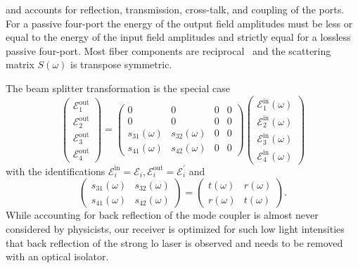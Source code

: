 and accounts for reflection, transmission, cross-talk, and coupling of the ports.
For a passive four-port the energy of the output field amplitudes must be less or equal to the energy of the input field amplitudes and strictly equal for a lossless passive four-port.
Most fiber components are reciprocal~\cite{NBS1981} and the scattering matrix $S(\omega)$ is transpose symmetric.

The beam splitter transformation is the special case
\begin{equation}
    \begin{pmatrix}
        \mathcal{E}_{1}^\text{out} \\
        \mathcal{E}_{2}^\text{out} \\
        \mathcal{E}_{3}^\text{out} \\
        \mathcal{E}_{4}^\text{out}
    \end{pmatrix}
    =
    \begin{pmatrix}
    	0 & 0 & 0 & 0 \\
    	0 & 0 & 0 & 0 \\
    	s_{31}(\omega) & s_{32}(\omega) & 0 & 0 \\
    	s_{41}(\omega) & s_{42}(\omega) & 0 & 0
    \end{pmatrix}
    \begin{pmatrix}
        \mathcal{E}_{1}^\text{in}(\omega) \\
        \mathcal{E}_{2}^\text{in}(\omega) \\
        \mathcal{E}_{3}^\text{in}(\omega) \\
        \mathcal{E}_{4}^\text{in}(\omega)
    \end{pmatrix}
\end{equation}
with the identifications $\mathcal{E}_i^\text{in}=\mathcal{E}_i,\mathcal{E}_i^\text{out}=\mathcal{E}_i^\prime$ and
\begin{equation}
    \begin{pmatrix}
    	s_{31}(\omega) & s_{32}(\omega) \\
    	s_{41}(\omega) & s_{42}(\omega)
    \end{pmatrix}
    =
    \begin{pmatrix}
    	t(\omega) & r(\omega) \\
    	r(\omega) & t(\omega)
    \end{pmatrix}
    .
\end{equation}
While accounting for back reflection of the mode coupler is almost never considered by physicists, our receiver is optimized for such low light intensities that back reflection of the strong \gls{lo} laser is observed and needs to be removed with an optical isolator. 


